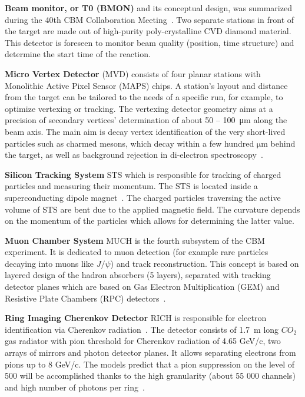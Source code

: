 \textbf{Beam monitor, or T0 (\gls{BMON})} and its conceptual design, was summarized during the 40th \gls{CBM} Collaboration Meeting~\cite{bmon}. Two separate stations in front of the target are made out of high-purity poly-crystalline CVD diamond material. This detector is foreseen to monitor beam quality (position, time structure) and determine the start time of the reaction.\bigbreak

\textbf{Micro Vertex Detector} (\gls{MVD}) consists of four planar stations with Monolithic Active Pixel Sensor (\gls{MAPS}) chips. A station's layout and distance from the target can be tailored to the needs of a specific run, for example, to optimize vertexing or tracking. The vertexing detector geometry aims at a precision of secondary vertices' determination of about 50 -- \SI{100}{\micro\metre} along the beam axis. The main aim is decay vertex identification of the very short-lived particles such as charmed mesons, which decay within a few hundred $\mathrm{\mu m}$ behind the target, as well as background rejection in di-electron spectroscopy~\cite{MVD}.\bigbreak

 \textbf{Silicon Tracking System} \gls{STS} which is responsible for tracking of charged particles and measuring their momentum. The \gls{STS} is located inside a superconducting dipole magnet~\cite{Malakhov:109025}. The charged particles traversing the active volume of \gls{STS} are bent due to the applied magnetic field. The curvature depends on the momentum of the particles which allows for determining the latter value.\bigbreak
 
\textbf{Muon Chamber System} \gls{MUCH} is the fourth subsystem of the \gls{CBM} experiment. It is dedicated to muon detection (for example rare particles decaying into muons like $J/\psi$) and track reconstruction. This concept is based on layered design of the hadron absorbers (5 layers), separated with tracking detector planes which are based on Gas Electron Multiplication (\gls{GEM}) and Resistive Plate Chambers (\gls{RPC}) detectors~\cite{MUCH}.\bigbreak

\textbf{Ring Imaging Cherenkov Detector} \gls{RICH} is responsible for electron identification via Cherenkov radiation~\cite{RICH}. The detector consists of \SI{1.7}{\metre} long $CO_{2}$ gas radiator with pion threshold for Cherenkov radiation of 4.65 GeV/c, two arrays of mirrors and photon detector planes. It allows separating electrons from pions up to 8 GeV/c. The models predict that a pion suppression on the level of 500 will be accomplished thanks to the high granularity (about 55 000 channels) and high number of photons per ring~\cite{RICH}.\bigbreak

